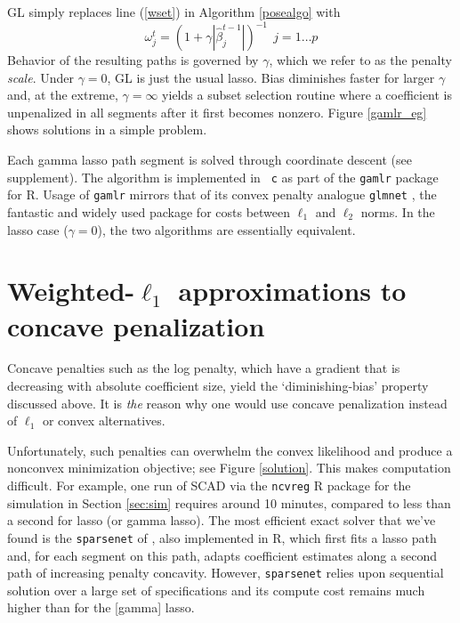 \documentclass[12pt]{article}
\begin{document}
GL simply replaces line (\ref{wset}) in Algorithm \ref{posealgo}  with
\begin{equation}\label{gammalasso}
\omega^{t}_j  = \left(1 + \gamma |\hat\beta^{t-1}_j|\right)^{-1} ~~j=1\ldots p 
\end{equation}
Behavior of the resulting paths  is governed by $\gamma$, which we refer to as the
penalty {\it scale}.  Under $\gamma=0$, GL is just the usual lasso.
 Bias diminishes faster for larger $\gamma$ and, at the  extreme,
$\gamma=\infty$ yields a subset selection routine where a coefficient is
unpenalized in all segments after it first becomes nonzero. Figure
\ref{gamlr_eg} shows solutions in a simple problem.

Each  gamma lasso path segment is solved through coordinate descent (see supplement).  The algorithm is implemented in {\tt
c} as part of the {\tt gamlr} package for {\sf R}. 
Usage of {\tt gamlr} mirrors that of its
convex penalty analogue {\tt glmnet} \citep{friedman_regularization_2010}, the
fantastic and widely used package for costs between $\ell_1$ and $\ell_2$ norms. In
the lasso case ($\gamma=0$), the two algorithms are essentially equivalent.


\section{Weighted-$\ell_1$ approximations to concave penalization}
\label{sec:weighted}


Concave penalties such as the log penalty, which have a gradient that is
decreasing with absolute coefficient size,  yield the `diminishing-bias'
property discussed above. It is {\it the} reason why one would
use concave penalization instead of $\ell_1$ or convex alternatives.

Unfortunately, such penalties can overwhelm the convex likelihood and produce a
nonconvex minimization objective; see Figure \ref{solution}.
This  makes computation difficult.  For example,  one run of SCAD via the
\texttt{ncvreg} R package \citep{breheny_coordinate_2011} for the simulation in
Section \ref{sec:sim} requires around 10 minutes, compared to less than a second for 
lasso (or gamma lasso).  The most efficient exact solver that we've found is the
\texttt{sparsenet} of \citet{mazumder_sparsenet_2011}, also implemented in R,
which first fits a lasso path and, for
each segment on this path, adapts coefficient estimates along a second path of
increasing penalty concavity. However, \texttt{sparsenet}  relies upon sequential solution
over a large set of specifications 
 and its compute cost remains much higher than for the [gamma] lasso.
\end{document}
